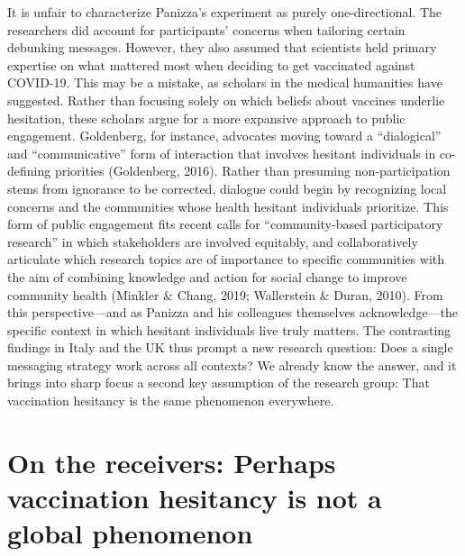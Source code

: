 \documentclass[authordate, empirical]{jote-new-article}
\begin{document}
	It is unfair to characterize Panizza's experiment as purely one-directional. The researchers did account for participants' concerns when tailoring certain debunking messages. However, they also assumed that scientists held primary expertise on what mattered most when deciding to get vaccinated against COVID-19. This may be a mistake, as scholars in the medical humanities have suggested. Rather than focusing solely on which beliefs about vaccines underlie hesitation, these scholars argue for a more expansive approach to public engagement. Goldenberg, for instance, advocates moving toward a “dialogical” and “communicative” form of interaction that involves hesitant individuals in co-defining priorities (Goldenberg, 2016). Rather than presuming non-participation stems from ignorance to be corrected, dialogue could begin by recognizing local concerns and the communities whose health hesitant individuals prioritize. This form of public engagement fits recent calls for “community-based participatory research” in which stakeholders are involved equitably, and collaboratively articulate which research topics are of importance to specific communities with the aim of combining knowledge and action for social change to improve community health (Minkler \& Chang, 2019; Wallerstein \& Duran, 2010). From this perspective—and as Panizza and his colleagues themselves acknowledge—the specific context in which hesitant individuals live truly matters. The contrasting findings in Italy and the UK thus prompt a new research question: Does a single messaging strategy work across all contexts? We already know the answer, and it brings into sharp focus a second key assumption of the research group: That vaccination hesitancy is the same phenomenon everywhere.







	\section{On the receivers: Perhaps vaccination hesitancy is not a global phenomenon}
\end{document}
